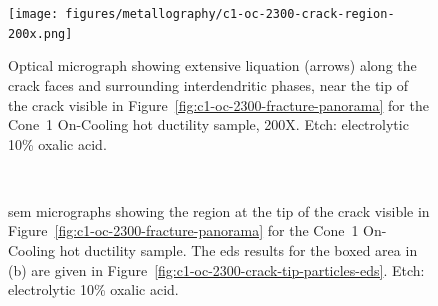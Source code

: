 {\begin{figure}
    \centering
    \texttt{[image: figures/metallography/c1-oc-2300-crack-region-200x.png]}
    \caption[]{Optical micrograph showing extensive liquation (arrows) along the crack faces and surrounding interdendritic phases, near the tip of the crack visible in Figure~\ref{fig:c1-oc-2300-fracture-panorama} for the Cone~1 On-Cooling \protect{} hot ductility sample, 200X. Etch: electrolytic 10\% oxalic acid.}
    \label{fig:c1-oc-2300-crack-region-200x}
\end{figure}

\begin{figure}
    \centering
     \\
    \caption{\Gls{sem} micrographs showing the region at the tip of the crack visible in Figure~\ref{fig:c1-oc-2300-fracture-panorama} for the Cone~1 On-Cooling \protect{} hot ductility sample. The \gls{eds} results for the boxed area in (b) are given in Figure~\ref{fig:c1-oc-2300-crack-tip-particles-eds}. Etch: electrolytic 10\% oxalic acid.}
    \label{fig:c1-oc-2300-crack-sem}
\end{figure}

}
